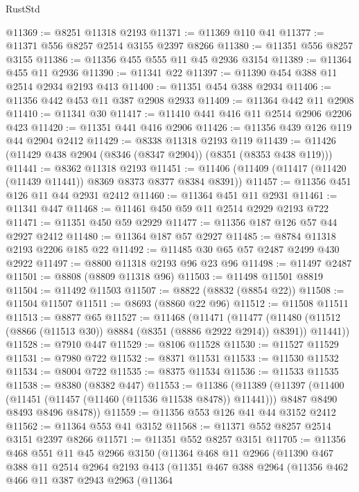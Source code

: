 \begin{lexlean}{RustStd}
\begin{coremodule}
@11369 := @8251 @11318 @2193
@11371 := @11369 @110 @41
@11377 := @11371 @556 @8257 @2514 @3155 @2397 @8266
@11380 := @11351 @556 @8257 @3155
@11386 := @11356 @455 @555 @11 @45 @2936 @3154
@11389 := @11364 @455 @11 @2936
@11390 := @11341 @22
@11397 := @11390 @454 @388 @11 @2514 @2934 @2193 @413
@11400 := @11351 @454 @388 @2934
@11406 := @11356 @442 @453 @11 @387 @2908 @2933
@11409 := @11364 @442 @11 @2908
@11410 := @11341 @30
@11417 := @11410 @441 @416 @11 @2514 @2906 @2206 @423
@11420 := @11351 @441 @416 @2906
@11426 := @11356 @439 @126 @119 @44 @2904 @2412
@11429 := @8338 @11318 @2193 @119
@11439 := @11426 (@11429 @438 @2904 (@8346 (@8347 @2904)) (@8351 (@8353 @438 @119)))
@11441 := @8362 @11318 @2193
@11451 := @11406 (@11409 (@11417 (@11420 (@11439 @11441)) @8369 @8373 @8377 @8384 @8391))
@11457 := @11356 @451 @126 @11 @44 @2931 @2412
@11460 := @11364 @451 @11 @2931
@11461 := @11341 @447
@11468 := @11461 @450 @59 @11 @2514 @2929 @2193 @722
@11471 := @11351 @450 @59 @2929
@11477 := @11356 @187 @126 @57 @44 @2927 @2412
@11480 := @11364 @187 @57 @2927
@11485 := @8784 @11318 @2193 @2206 @185 @22
@11492 := @11485 @30 @65 @57 @2487 @2499 @430 @2922
@11497 := @8800 @11318 @2193 @96 @23 @96
@11498 := @11497 @2487
@11501 := @8808 (@8809 @11318 @96)
@11503 := @11498 @11501 @8819
@11504 := @11492 @11503
@11507 := @8822 (@8832 (@8854 @22))
@11508 := @11504 @11507
@11511 := @8693 (@8860 @22 @96)
@11512 := @11508 @11511
@11513 := @8877 @65
@11527 := @11468
    (@11471
      (@11477
        (@11480 (@11512 (@8866 (@11513 @30)) @8884 (@8351 (@8886 @2922 @2914)) @8391))
        @11441))
@11528 := @7910 @447
@11529 := @8106 @11528
@11530 := @11527 @11529
@11531 := @7980 @722
@11532 := @8371 @11531
@11533 := @11530 @11532
@11534 := @8004 @722
@11535 := @8375 @11534
@11536 := @11533 @11535
@11538 := @8380 (@8382 @447)
@11553 := @11386
    (@11389
      (@11397
        (@11400 (@11451 (@11457 (@11460 (@11536 @11538 @8478)) @11441)))
        @8487
        @8490
        @8493
        @8496
        @8478))
@11559 := @11356 @553 @126 @41 @44 @3152 @2412
@11562 := @11364 @553 @41 @3152
@11568 := @11371 @552 @8257 @2514 @3151 @2397 @8266
@11571 := @11351 @552 @8257 @3151
@11705 := @11356
    @468
    @551
    @11
    @45
    @2966
    @3150
    (@11364
      @468
      @11
      @2966
      (@11390
        @467
        @388
        @11
        @2514
        @2964
        @2193
        @413
        (@11351
          @467
          @388
          @2964
          (@11356
            @462
            @466
            @11
            @387
            @2943
            @2963
            (@11364

\end{coremodule}
\end{lexlean}
